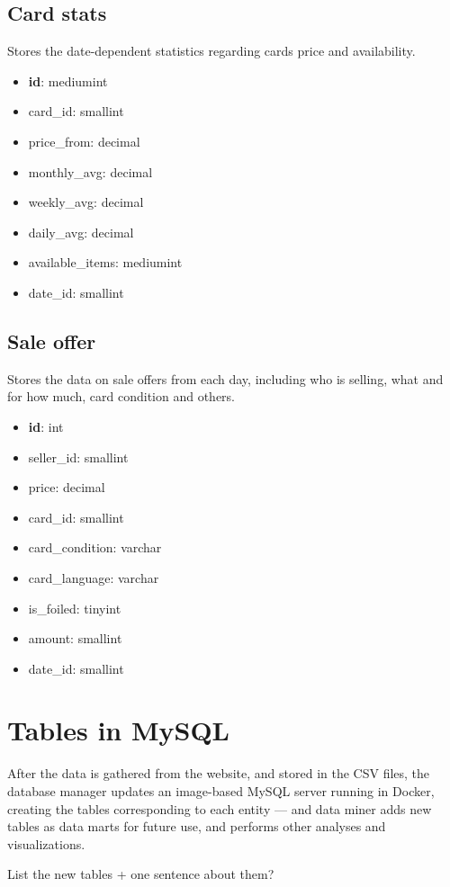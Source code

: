 \subsection*{Card stats}
Stores the date-dependent statistics regarding cards price and availability.
\begin{itemize}
\setlength\itemsep{0.2em}
\item \textbf{id}: mediumint
\item card\_id: smallint
\item price\_from: decimal
\item monthly\_avg: decimal
\item weekly\_avg: decimal
\item daily\_avg: decimal
\item available\_items: mediumint
\item date\_id: smallint
\end{itemize}

\subsection*{Sale offer}
Stores the data on sale offers from each day, including who is selling, what and for how much, card condition and others.
\begin{itemize}
\setlength\itemsep{0.2em}
\item \textbf{id}: int
\item seller\_id: smallint
\item price: decimal
\item card\_id: smallint
\item card\_condition: varchar
\item card\_language: varchar
\item is\_foiled: tinyint
\item amount: smallint
\item date\_id: smallint
\end{itemize}

\section{Tables in MySQL}
After the data is gathered from the website, and stored in the CSV files, the database manager updates an image-based MySQL server running in Docker, creating the tables corresponding to each entity --- and data miner adds new tables as data marts for future use, and performs other analyses and visualizations.

List the new tables + one sentence about them?